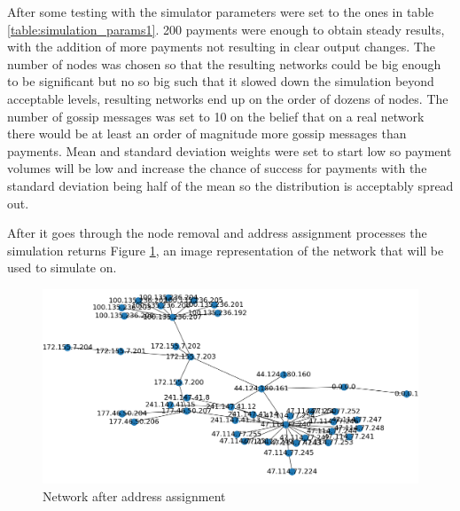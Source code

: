 After some testing with the simulator parameters were set to the ones in table \ref{table:simulation_params1}. 200 payments were enough to obtain steady results, with the addition of more payments not resulting in clear output changes. The number of nodes was chosen so that the resulting networks could be big enough to be significant but no so big such that it slowed down the simulation beyond acceptable levels, resulting networks end up
on the order of dozens of nodes. The number of gossip messages was set to 10 on the belief that on a real network there would be at least an order of magnitude more gossip messages than payments. Mean and standard deviation weights were set to start low so payment volumes will be low and increase the chance of success for payments with the standard deviation being half of the mean so the distribution is acceptably spread out.

\begin{table}[H]
\centering
{}
\caption{Parameters for the first simulation}
\label{table:simulation_params1}
\end{table}

After it goes through the node removal and address assignment processes the simulation returns Figure \ref{fig:sim_net_addr}, an image representation of the network that will be used to simulate on.

\begin{figure}[H]
\begin{center}
  \includegraphics[width=\linewidth]{images/sim_net_addr.png}
  \caption{Network after address assignment}
  \label{fig:sim_net_addr}
  \end{center}
\end{figure}

